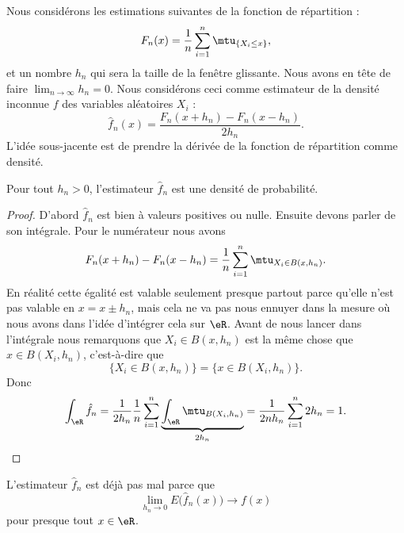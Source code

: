 Nous considérons les estimations suivantes de la fonction de répartition :
\begin{equation}
	F_n(x)=\frac{1}{ n }\sum_{i=1}^n\mtu_{\{ X_i\leq x \}},
\end{equation}
et un nombre \( h_n\) qui sera la taille de la fenêtre glissante. Nous avons en tête de faire \( \lim_{n\to \infty} h_n=0\). Nous considérons ceci comme estimateur de la densité inconnue \( f\) des variables aléatoires \( X_i\) :
\begin{equation}
	\hat f_n(x)=\frac{ F_n(x+h_n)-F_n(x-h_n) }{ 2h_n }.
\end{equation}
L'idée sous-jacente est de prendre la dérivée de la fonction de répartition comme densité.

\begin{lemma}
	Pour tout \( h_n>0\), l'estimateur \( \hat f_n\) est une densité de probabilité.
\end{lemma}

\begin{proof}
	D'abord \( \hat f_n\) est bien à valeurs positives ou nulle. Ensuite devons parler de son intégrale. Pour le numérateur nous avons
	\begin{equation}
		F_n(x+h_n)-F_n(x-h_n)=\frac{1}{ n }\sum_{i=1}^{n}\mtu_{X_i\in B(x,h_n)}.
	\end{equation}
	En réalité cette égalité est valable seulement presque partout parce qu'elle n'est pas valable en \( x=x\pm h_n\), mais cela ne va pas nous ennuyer dans la mesure où nous avons dans l'idée d'intégrer cela sur \( \eR\). Avant de nous lancer dans l'intégrale nous remarquons que \( X_i\in B(x,h_n)\) est la même chose que \( x\in B(X_i,h_n)\), c'est-à-dire que
	\begin{equation}
		\{ X_i\in B(x,h_n) \}=\{ x\in B(X_i,h_n) \}.
	\end{equation}
	Donc
	\begin{equation}
		\int_{\eR}\hat f_n=\frac{1}{ 2h_n }\frac{1}{ n }\sum_{i=1}^n\underbrace{\int_{\eR}\mtu_{B(X_i,h_n)}}_{2h_n}=\frac{1}{ 2nh_n }\sum_{i=1}^n2h_n=1.
	\end{equation}
\end{proof}

\begin{lemma}   \label{LemTZopXDd}
	L'estimateur \( \hat f_n\) est déjà pas mal parce que
	\begin{equation}
		\lim_{h_n\to 0} E\big( \hat f_n(x) \big)\to f(x)
	\end{equation}
	pour presque tout \( x\in \eR\).
\end{lemma}

